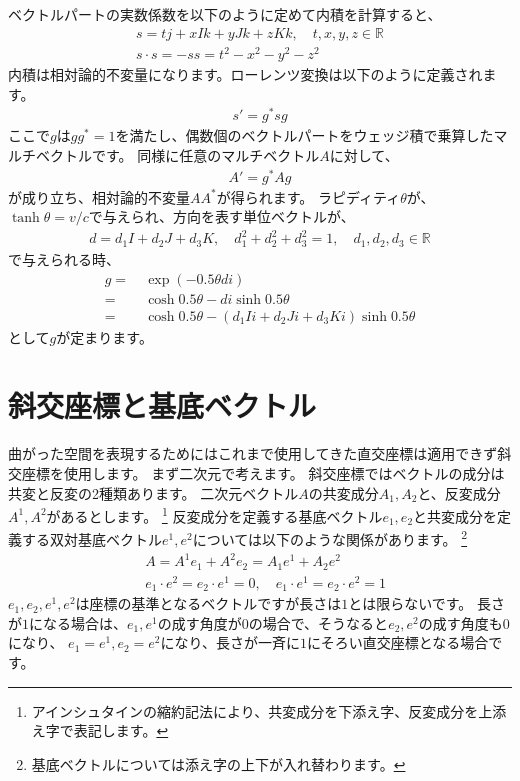 \documentclass[a4paper,12pt,notitlepage]{jsreport}
\begin{document}
ベクトルパートの実数係数を以下のように定めて内積を計算すると、
\begin{gather}
  s=tj+xIk+yJk+zKk,\quad t,x,y,z\in\mathbb{R}\\
  s\cdot s=-ss=t^2-x^2-y^2-z^2
\end{gather}
内積は相対論的不変量になります。ローレンツ変換は以下のように定義されます。
\begin{gather}
  s'=g^*sg
\end{gather}
ここで$g$は$gg^*=1$を満たし、偶数個のベクトルパートをウェッジ積で乗算したマルチベクトルです。
同様に任意のマルチベクトル$A$に対して、
\begin{gather}
  A'=g^*Ag
\end{gather}
が成り立ち、相対論的不変量$AA^*$が得られます。
ラピディティ$\theta$が、$\tanh\theta=v/c$で与えられ、方向を表す単位ベクトルが、
\begin{gather}
  d=d_1I+d_2J+d_3K,\quad d_1^2+d_2^2+d_3^2=1,\quad d_1,d_2,d_3\in\mathbb{R}
\end{gather}
で与えられる時、
\begin{equation}
  \begin{split}
    g=~&\exp(-0.5\theta di)\\
    =~&\cosh 0.5\theta-di\sinh 0.5\theta\\
    =~&\cosh 0.5\theta-(d_1Ii+d_2Ji+d_3Ki)\sinh 0.5\theta
  \end{split}
\end{equation}
として$g$が定まります。

\section{斜交座標と基底ベクトル}

曲がった空間を表現するためにはこれまで使用してきた直交座標は適用できず斜交座標を使用します。
まず二次元で考えます。
斜交座標ではベクトルの成分は共変と反変の2種類あります。
二次元ベクトル$A$の共変成分$A_1,A_2$と、反変成分$A^1,A^2$があるとします。
\footnote{アインシュタインの縮約記法により、共変成分を下添え字、反変成分を上添え字で表記します。}
反変成分を定義する基底ベクトル$e_1,e_2$と共変成分を定義する双対基底ベクトル$e^1,e^2$については以下のような関係があります。
\footnote{基底ベクトルについては添え字の上下が入れ替わります。}
\begin{equation}
  \begin{split}
    &A=A^1e_1+A^2e_2=A_1e^1+A_2e^2\\
    &e_1\cdot e^2=e_2\cdot e^1=0,\quad e_1\cdot e^1=e_2\cdot e^2=1
  \end{split}
\end{equation}
$e_1,e_2,e^1,e^2$は座標の基準となるベクトルですが長さは$1$とは限らないです。
長さが$1$になる場合は、$e_1,e^1$の成す角度が$0$の場合で、そうなると$e_2,e^2$の成す角度も$0$になり、
$e_1=e^1,e_2=e^2$になり、長さが一斉に$1$にそろい直交座標となる場合です。
\end{document}
